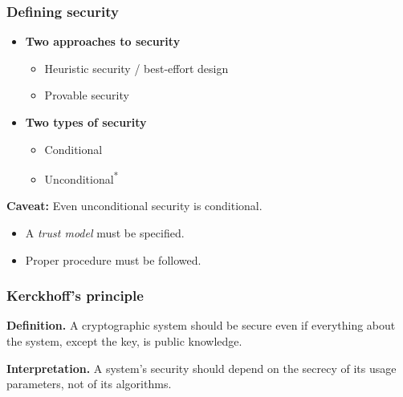 \begin{frame}
  \frametitle{Defining security}

  \pause
  \begin{itemize}
    \item \textbf{Two approaches to security}
    \begin{itemize}
      \pause
      \item Heuristic security / best-effort design
      \pause
      \item Provable security
    \end{itemize}

    \vspace*{1em}

    \pause
    \item \textbf{Two types of security}
    \begin{itemize}
      \item Conditional
      \item Unconditional\textsuperscript{*}
    \end{itemize}
  \end{itemize}

  \vspace*{1em}

  \pause
  \textbf{Caveat:} Even unconditional security is conditional.
  \pause
  \begin{itemize}
    \item A \emph{trust model} must be specified.
    \pause
    \item Proper procedure must be followed.
  \end{itemize}
\end{frame}

\begin{frame}
  \frametitle{Kerckhoff's principle}

  \pause
  \textbf{Definition.}
  A cryptographic system should be secure even if everything about the system, except the key, is public knowledge.

  \vspace*{1em}

  \pause
  \textbf{Interpretation.}
  A system's security should depend on the secrecy of its usage parameters, not of its algorithms.
\end{frame}

